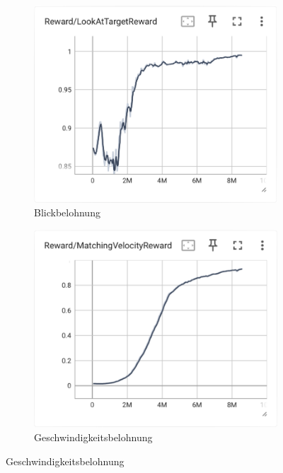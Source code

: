\begin{figure}[H]
\begin{subfigure}{.49\textwidth}
    \end{subfigure}
     \begin{subfigure}{.49\textwidth}
      \centering  
      \includegraphics[width=\textwidth]{img/128_look_reward}
      \caption{Blickbelohnung}
      \label{fig:128_look_reward}
    \end{subfigure}
    \begin{subfigure}{.49\textwidth}
      \centering  
      \includegraphics[width=\textwidth]{img/128_vel_reward}
      \caption{Geschwindigkeitsbelohnung}
      \label{fig:128_vel_reward}
    \end{subfigure}

\end{figure}
